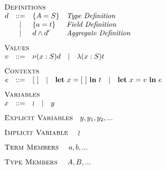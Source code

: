\begin{minipage}[t]{.4\textwidth}\[\begin{array}{r c l l}
    \multicolumn{4}{l}{\textsc{Definitions}}                  \\
    d & ::= & \DEF{A}{S}      & \textit{Type Definition     } \\
      &  |  & \DEF{a}{t}      & \textit{Field Definition    } \\
      &  |  & \AGG{d}{d'}     & \textit{Aggregate Definition} \\[3mm]
    \multicolumn{4}{l}{\textsc{Values}} \\
    v & ::= & \multicolumn{2}{l}{\OBJ{x}{S}{d}
        \quad | \quad \ABS{x}{S}{t}} \\[3mm]
    \multicolumn{4}{l}{\textsc{Contexts}} \\
    e & ::= & \multicolumn{2}{l}{\HOL
        \quad | \quad \LET{x}{\HOL}{t}
        \quad | \quad \LET{x}{v}{e}} \\[3mm]
    \multicolumn{4}{l}{\textsc{Variables}} \\
    x & ::= & \multicolumn{2}{l}{\IMP
        \quad | \quad y} \\[3mm]
    \multicolumn{4}{l}{\textsc{Explicit Variables} \quad y, y_1, y_2, ...} \\[3mm]
    \multicolumn{4}{l}{\textsc{Implicit Variable } \quad \IMP     } \\[3mm]
    \multicolumn{4}{l}{\textsc{Term Members      } \quad a, b, ...} \\[3mm]
    \multicolumn{4}{l}{\textsc{Type Members      } \quad A, B, ...} \\[3mm]
\end{array}\]\end{minipage}

